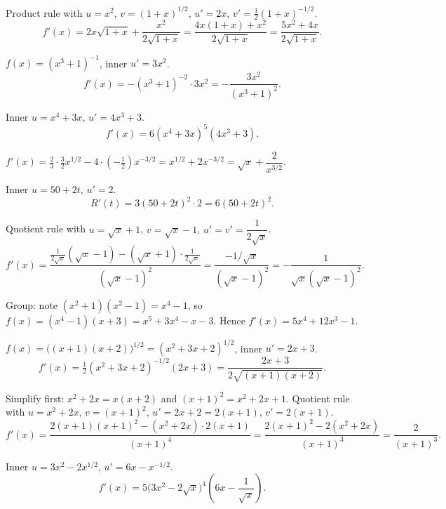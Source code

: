 \begin{solutions}
  \item Product rule with $u=x^{2}$, $v=(1+x)^{1/2}$, $u'=2x$,
        $v'=\tfrac12(1+x)^{-1/2}$.
        \[
          f'(x)=2x\sqrt{1+x}+\frac{x^{2}}{2\sqrt{1+x}}
               =\frac{4x(1+x)+x^{2}}{2\sqrt{1+x}}=\frac{5x^{2}+4x}{2\sqrt{1+x}} .
        \]

  \item $f(x)=(x^{3}+1)^{-1}$, inner $u'=3x^{2}$.
        \[
          f'(x)=-(x^{3}+1)^{-2}\cdot 3x^{2}=-\frac{3x^{2}}{(x^{3}+1)^{2}} .
        \]

  \item Inner $u=x^{4}+3x$, $u'=4x^{3}+3$.
        \[
          f'(x)=6(x^{4}+3x)^{5}(4x^{3}+3) .
        \]

  \item $f'(x)=\tfrac23\cdot\tfrac32x^{1/2}-4\cdot(-\tfrac12)x^{-3/2}
        =x^{1/2}+2x^{-3/2}=\sqrt{x}+\dfrac{2}{x^{3/2}}$.

  \item Inner $u=50+2t$, $u'=2$.
        \[
          R'(t)=3(50+2t)^{2}\cdot 2=6(50+2t)^{2} .
        \]

  \item Quotient rule with $u=\sqrt{x}+1$, $v=\sqrt{x}-1$,
        $u'=v'=\dfrac{1}{2\sqrt{x}}$.
        \[
          f'(x)=\frac{\frac{1}{2\sqrt{x}}(\sqrt{x}-1)
               -(\sqrt{x}+1)\cdot\frac{1}{2\sqrt{x}}}{(\sqrt{x}-1)^{2}}
               =\frac{-1/\sqrt{x}}{(\sqrt{x}-1)^{2}}
               =-\frac{1}{\sqrt{x}(\sqrt{x}-1)^{2}} .
        \]

  \item Group: note $(x^{2}+1)(x^{2}-1)=x^{4}-1$, so
        $f(x)=(x^{4}-1)(x+3)=x^{5}+3x^{4}-x-3$. Hence
        $f'(x)=5x^{4}+12x^{3}-1$.

  \item $f(x)=\bigl((x+1)(x+2)\bigr)^{1/2}=(x^{2}+3x+2)^{1/2}$, inner
        $u'=2x+3$.
        \[
          f'(x)=\tfrac12(x^{2}+3x+2)^{-1/2}(2x+3)
               =\frac{2x+3}{2\sqrt{(x+1)(x+2)}} .
        \]

  \item Simplify first: $x^{2}+2x=x(x+2)$ and $(x+1)^{2}=x^{2}+2x+1$.
        Quotient rule with $u=x^{2}+2x$, $v=(x+1)^{2}$, $u'=2x+2=2(x+1)$,
        $v'=2(x+1)$.
        \[
          f'(x)=\frac{2(x+1)(x+1)^{2}-(x^{2}+2x)\cdot 2(x+1)}{(x+1)^{4}}
               =\frac{2(x+1)^{2}-2(x^{2}+2x)}{(x+1)^{3}}=\frac{2}{(x+1)^{3}} .
        \]

  \item Inner $u=3x^{2}-2x^{1/2}$, $u'=6x-x^{-1/2}$.
        \[
          f'(x)=5\bigl(3x^{2}-2\sqrt{x}\bigr)^{4}\left(6x-\frac{1}{\sqrt{x}}\right) .
        \]
\end{solutions}


